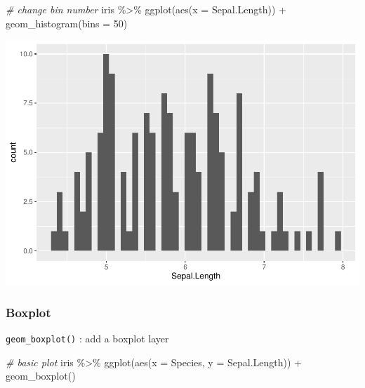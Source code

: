 \documentclass[
]{article}
\newenvironment{Shaded}{\begin{snugshade}}{\end{snugshade}}
\newcommand{\AttributeTok}[1]{\textcolor[rgb]{0.77,0.63,0.00}{#1}}
\newcommand{\CommentTok}[1]{\textcolor[rgb]{0.56,0.35,0.01}{\textit{#1}}}
\newcommand{\DecValTok}[1]{\textcolor[rgb]{0.00,0.00,0.81}{#1}}
\newcommand{\FunctionTok}[1]{\textcolor[rgb]{0.00,0.00,0.00}{#1}}
\newcommand{\NormalTok}[1]{#1}
\newcommand{\SpecialCharTok}[1]{\textcolor[rgb]{0.00,0.00,0.00}{#1}}
\begin{document}
\begin{Shaded}
\begin{Highlighting}[]
\CommentTok{\# change bin number}
\NormalTok{iris }\SpecialCharTok{\%\textgreater{}\%} 
  \FunctionTok{ggplot}\NormalTok{(}\FunctionTok{aes}\NormalTok{(}\AttributeTok{x =}\NormalTok{ Sepal.Length)) }\SpecialCharTok{+}
  \FunctionTok{geom\_histogram}\NormalTok{(}\AttributeTok{bins =} \DecValTok{50}\NormalTok{)}
\end{Highlighting}
\end{Shaded}

\begin{center}\includegraphics{biostats_files/figure-latex/unnamed-chunk-120-3} \end{center}

\hypertarget{boxplot}{%
\subsubsection{Boxplot}\label{boxplot}}

\texttt{geom\_boxplot()} : add a boxplot layer

\begin{Shaded}
\begin{Highlighting}[]
\CommentTok{\# basic plot}
\NormalTok{iris }\SpecialCharTok{\%\textgreater{}\%} 
  \FunctionTok{ggplot}\NormalTok{(}\FunctionTok{aes}\NormalTok{(}\AttributeTok{x =}\NormalTok{ Species,}
             \AttributeTok{y =}\NormalTok{ Sepal.Length)) }\SpecialCharTok{+}
  \FunctionTok{geom\_boxplot}\NormalTok{()}
\end{Highlighting}
\end{Shaded}
\end{document}
